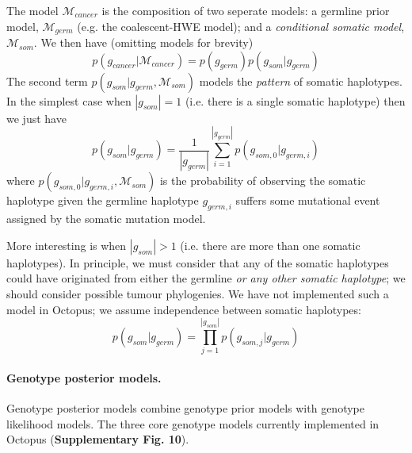 \documentclass[notitlepage, twocolumn, 10pt]{article}
\begin{document}
The model $\mathcal{M}_{cancer}$ is the composition of two seperate models: a germline prior model, $\mathcal{M}_{germ}$ (e.g. the coalescent-HWE model); and a \emph{conditional somatic model}, $\mathcal{M}_{som}$. We then have (omitting models for brevity)
\begin{equation*}
 p(g_{cancer} | \mathcal{M}_{cancer}) = p(g_{germ}) p(g_{som} | g_{germ})
\end{equation*}
The second term $p(g_{som} | g_{germ}, \mathcal{M}_{som})$ models the \emph{pattern} of somatic haplotypes. In the simplest case when $|g_{som}| = 1$ (i.e. there is a single somatic haplotype) then we just have
\begin{equation*}
	p(g_{som} | g_{germ}) = \frac{1}{|g_{germ}|} \sum_{i = 1}^{|g_{germ}|} p(g_{som,0} | g_{germ, i})
\end{equation*}
where $p(g_{som,0} | g_{germ, i}, \mathcal{M}_{som})$ is the probability of observing the somatic haplotype given the germline haplotype $g_{germ, i}$ suffers some mutational event assigned by the somatic mutation model.

More interesting is when $|g_{som}| > 1$ (i.e. there are more than one somatic haplotypes). In principle, we must consider that any of the somatic haplotypes could have originated from either the germline \emph{or any other somatic haplotype}; we should consider possible tumour phylogenies. We have not implemented such a model in Octopus; we assume independence between somatic haplotypes:
\begin{equation*}
p(g_{som} | g_{germ}) = \prod_{j = 1}^{|g_{som}|} p(g_{som,j} | g_{germ})
\end{equation*}

\paragraph*{Genotype posterior models.} Genotype posterior models combine genotype prior models with genotype likelihood models. The three core genotype models currently implemented in Octopus (\textbf{Supplementary Fig. 10}).
\end{document}
